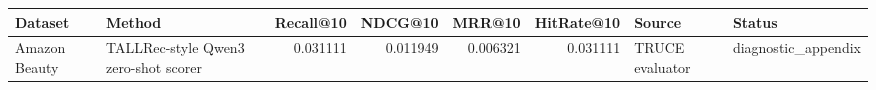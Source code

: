 \begin{tabular}{llrrrrll}
\toprule
Dataset & Method & Recall@10 & NDCG@10 & MRR@10 & HitRate@10 & Source & Status \\
\midrule
Amazon Beauty & TALLRec-style Qwen3 zero-shot scorer & 0.031111 & 0.011949 & 0.006321 & 0.031111 & TRUCE evaluator & diagnostic\_appendix \\
\bottomrule
\end{tabular}
